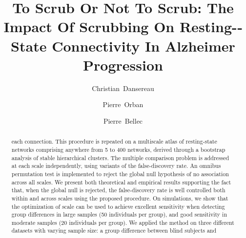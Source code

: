 \documentclass[authoryear,preprint,review]{elsarticle}
\begin{document}
\begin{frontmatter}
\title{To Scrub Or Not To Scrub: The Impact Of Scrubbing On Resting-­State Connectivity In Alzheimer Progression}
\author[a,b]{Christian~Dansereau}
\author[a]{Pierre~Orban}
\author[a,b]{Pierre~Bellec}
\address[a]{Centre de Recherche de l'Institut Universitaire de G\'eriatrie de Montr\'eal, Montr\'eal, CA}
\address[b]{D\'epartement d'Informatique et de recherche op\'erationnelle, Universit\'e de Montr\'eal, Montr\'eal,
CA}


\begin{abstract}
each connection. This procedure is repeated on a multiscale atlas of resting-state networks comprising anywhere from 5 to 400 networks, derived through a bootstrap analysis of stable hierarchical clusters. The multiple comparison problem is addressed at each scale independently, using variants of the false-discovery rate. An omnibus permutation test is implemented to reject the global null hypothesis of no association across all scales. We present both theoretical and empirical results supporting the fact that, when the global null is rejected, the false-discovery rate is well controlled both within and across scales using the proposed procedure. On simulations, we show that the optimization of scale can be used to achieve excellent sensitivity when detecting group differences in large samples (50 individuals per group), and good sensitivity in moderate samples (20 individuals per group). We applied the method on three different datasets with varying sample size: a group difference between blind subjects and 

\end{abstract}
\end{frontmatter}
\end{document}
